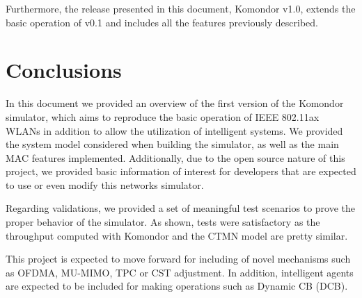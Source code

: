 \documentclass[a4paper]{article}
\begin{document}
		Furthermore, the release presented in this document, Komondor v1.0, extends the basic operation of v0.1 and includes all the features previously described.

\section{Conclusions}
\label{section:conclusions}
In this document we provided an overview of the first version of the Komondor simulator, which aims to reproduce the basic operation of IEEE 802.11ax WLANs in addition to allow the utilization of intelligent systems. We provided the system model considered when building the simulator, as well as the main MAC features implemented. Additionally, due to the open source nature of this project, we provided basic information of interest for developers that are expected to use or even modify this networks simulator.

Regarding validations, we provided a set of meaningful test scenarios to prove the proper behavior of the simulator. As shown,  tests were satisfactory as the throughput computed with Komondor and the CTMN model are pretty similar.

This project is expected to move forward for including of novel mechanisms such as OFDMA, MU-MIMO, TPC or  CST adjustment. In addition, intelligent agents are expected to be included for making operations such as Dynamic CB (DCB).



\end{document}

